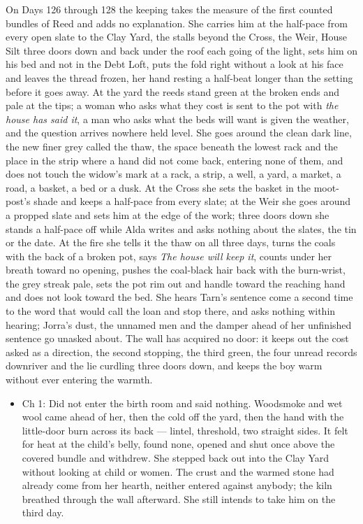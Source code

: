 \documentclass{design/chronicle}
\begin{document}
{On Days 126 through 128 the keeping takes the measure of the first counted bundles of Reed and adds no explanation. She carries him at the half-pace from every open slate to the Clay Yard, the stalls beyond the Cross, the Weir, House Silt three doors down and back under the roof each going of the light, sets him on his bed and not in the Debt Loft, puts the fold right without a look at his face and leaves the thread frozen, her hand resting a half-beat longer than the setting before it goes away. At the yard the reeds stand green at the broken ends and pale at the tips; a woman who asks what they cost is sent to the pot with \emph{the house has said it}, a man who asks what the beds will want is given the weather, and the question arrives nowhere held level. She goes around the clean dark line, the new finer grey called the thaw, the space beneath the lowest rack and the place in the strip where a hand did not come back, entering none of them, and does not touch the widow’s mark at a rack, a strip, a well, a yard, a market, a road, a basket, a bed or a dusk. At the Cross she sets the basket in the moot-post’s shade and keeps a half-pace from every slate; at the Weir she goes around a propped slate and sets him at the edge of the work; three doors down she stands a half-pace off while Alda writes and asks nothing about the slates, the tin or the date. At the fire she tells it the thaw on all three days, turns the coals with the back of a broken pot, says \emph{The house will keep it}, counts under her breath toward no opening, pushes the coal-black hair back with the burn-wrist, the grey streak pale, sets the pot rim out and handle toward the reaching hand and does not look toward the bed. She hears Tarn’s sentence come a second time to the word that would call the loan and stop there, and asks nothing within hearing; Jorra’s dust, the unnamed men and the damper ahead of her unfinished sentence go unasked about. The wall has acquired no door: it keeps out the cost asked as a direction, the second stopping, the third green, the four unread records downriver and the lie curdling three doors down, and keeps the boy warm without ever entering the warmth.

\begin{itemize}[leftmargin=1.4em,itemsep=1pt,topsep=3pt,parsep=0pt]

\item Ch 1: Did not enter the birth room and said nothing. Woodsmoke and wet wool came ahead of her, then the cold off the yard, then the hand with the little-door burn across its back --- lintel, threshold, two straight sides. It felt for heat at the child’s belly, found none, opened and shut once above the covered bundle and withdrew. She stepped back out into the Clay Yard without looking at child or women. The crust and the warmed stone had already come from her hearth, neither entered against anybody; the kiln breathed through the wall afterward. She still intends to take him on the third day.


\end{itemize}}
\end{document}
